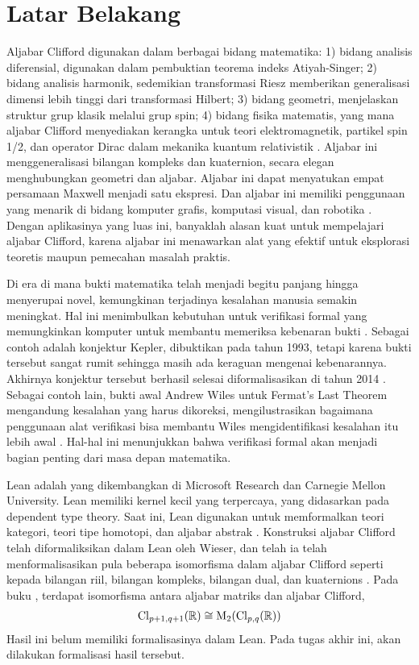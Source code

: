 \section{Latar Belakang}

Aljabar Clifford digunakan dalam berbagai bidang matematika: 1) bidang analisis diferensial, digunakan dalam pembuktian teorema indeks Atiyah-Singer; 2) bidang analisis harmonik, sedemikian transformasi Riesz memberikan generalisasi dimensi lebih tinggi dari transformasi Hilbert; 3) bidang geometri, menjelaskan struktur grup klasik melalui grup spin; 4) bidang fisika matematis, yang mana aljabar Clifford menyediakan kerangka untuk teori elektromagnetik, partikel spin 1/2, dan operator Dirac dalam mekanika kuantum relativistik \citep{Garling2011}. Aljabar ini menggeneralisasi bilangan kompleks dan kuaternion, secara elegan menghubungkan geometri dan aljabar. Aljabar ini dapat menyatukan empat persamaan Maxwell menjadi satu ekspresi. Dan aljabar ini memiliki penggunaan yang menarik di bidang komputer grafis, komputasi visual, dan robotika \citep{Wieser2024}. Dengan aplikasinya yang luas ini, banyaklah alasan kuat untuk mempelajari aljabar Clifford, karena aljabar ini menawarkan alat yang efektif untuk eksplorasi teoretis maupun pemecahan masalah praktis.

Di era di mana bukti matematika telah menjadi begitu panjang hingga menyerupai novel, kemungkinan terjadinya kesalahan manusia semakin meningkat. Hal ini menimbulkan kebutuhan untuk verifikasi formal yang memungkinkan komputer untuk membantu memeriksa kebenaran bukti \citep{Palmer2020}. Sebagai contoh adalah konjektur Kepler, dibuktikan pada tahun 1993, tetapi karena bukti tersebut sangat rumit sehingga masih ada keraguan mengenai kebenarannya. Akhirnya konjektur tersebut berhasil selesai diformalisasikan di tahun 2014 \citep{Tao2024}. Sebagai contoh lain, bukti awal Andrew Wiles untuk Fermat's Last Theorem mengandung kesalahan yang harus dikoreksi, mengilustrasikan bagaimana penggunaan alat verifikasi bisa membantu Wiles mengidentifikasi kesalahan itu lebih awal \citep{Palmer2020}. Hal-hal ini menunjukkan bahwa verifikasi formal akan menjadi bagian penting dari masa depan matematika.

Lean adalah \thpr{} yang dikembangkan di Microsoft Research dan Carnegie Mellon University. Lean memiliki kernel kecil yang terpercaya, yang didasarkan pada dependent type theory. Saat ini, Lean digunakan untuk memformalkan teori kategori, teori tipe homotopi, dan aljabar abstrak \citep{Moura2015}. Konstruksi aljabar Clifford telah diformaliksikan dalam Lean oleh Wieser, dan telah ia telah menformalisasikan pula beberapa isomorfisma dalam aljabar Clifford seperti kepada bilangan riil, bilangan kompleks, bilangan dual, dan kuaternions \citep{Wieser2024}. Pada buku \cite{Lounesto2001}, terdapat  isomorfisma antara aljabar matriks dan aljabar Clifford,
\begin{align*}
    \operatorname{Cl}_{p+1,q+1}(\mathbb{R}) \cong \mathrm{M}_2(\operatorname{Cl}_{p,q}(\mathbb{R}))
\end{align*}
Hasil ini belum memiliki formalisasinya dalam Lean. Pada tugas akhir ini, akan dilakukan  formalisasi hasil tersebut.

